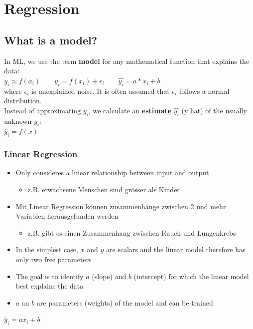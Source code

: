 \section{Regression}
\subsection{What is a model?}
In ML, we use the term \textbf{model} for any mathematical function that explains the data:\\ 
$y_i \approx f(x_i) \qquad y_i = f(x_i) + \epsilon_i \qquad \hat{y_i}=a*x_i+b$\\ 
where $\epsilon_i$ is unexplained noise. It is often assumed that $\epsilon_i$ follows a normal distribution.\\ 
Instead of approximating $y_i$, we calculate an \textbf{estimate} $\hat{y_i}$ (y hat) of the usually unknown $y_i$: \\
$\hat{y}_i = f(x)$

\subsubsection{Linear Regression}
\label{sec:lin_reg}
\begin{itemize}
    \item Only consideres a linear relationship between input and output
     \begin{itemize}
         \item z.B. erwachsene Menschen sind grösser als Kinder
     \end{itemize}
     \item Mit Linear Regression können zusammenhänge zwischen 2 und mehr Variablen herausgefunden werden
     \begin{itemize}
         \item z.B. gibt es einen Zusammenhang zwischen Rauch und Lungenkrebs
     \end{itemize}
    \item In the simplest case, $x$ and $y$ are scalars and the linear model therefore has only two free parameters
    \item The goal is to identify $a$ (slope) and $b$ (intercept) for which the linear model best explains the data
    \item $a$ an $b$ are parameters (weights) of the model and can be trained
\end{itemize}
\begin{center}
    $\hat{y}_i = ax_i + b$
\end{center}

